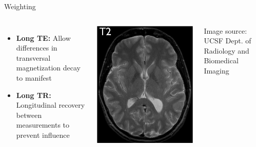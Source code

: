 \begin{frame}{\transtime{} Weighting}

    \begin{columns}[t,onlytextwidth]
        

        \begin{itemize}
            \item \textbf{Long TE:} Allow differences in transversal magnetization decay to manifest
            \item \textbf{Long TR:} Longitudinal recovery between measurements to prevent \longtime{} influence
        \end{itemize}

        \includegraphics[height=0.6\textheight]{images/t2}

        {\scriptsize Image source: UCSF Dept. of Radiology and Biomedical Imaging}
    \end{columns}
\end{frame}

